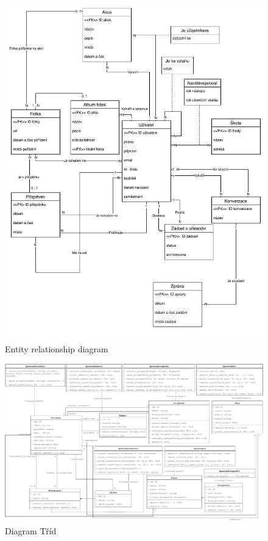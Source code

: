 \documentclass{article}
\begin{document}
\begin{figure}[p]
    \centering
    \includegraphics[scale=0.9]{fig/er.drawio.pdf}
    \caption{Entity relationship diagram}
\end{figure}

\begin{figure}
    \centering
    \includegraphics[scale=0.65]{fig/tridy.drawio.pdf}
    \caption{Diagram Tříd}
\end{figure}
\end{document}
